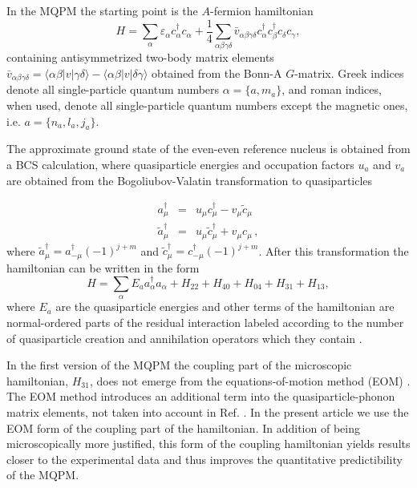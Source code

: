 In the MQPM the starting point is the $A$-fermion hamiltonian
\begin{equation}
       H = \sum_{\alpha} \varepsilon_{\alpha} c^{\dagger}_{\alpha} c_{\alpha} +
       \frac{1}{4}\sum_{\alpha\beta\gamma\delta} 
       {\bar{v}}_{\alpha\beta\gamma\delta}
       c^{\dagger}_{\alpha}c^{\dagger}_{\beta} c_{\delta} c_{\gamma},
\end{equation}
containing antisymmetrized two-body matrix elements 
${\bar{v}}_{\alpha\beta\gamma\delta}=\langle \alpha\beta\vert v
\vert \gamma\delta\rangle - \langle \alpha\beta\vert v 
\vert \delta\gamma\rangle$
obtained from the Bonn-A $G$-matrix. Greek 
indices denote all single-particle quantum numbers 
$\alpha=\lbrace a,m_a \rbrace$, and roman indices, when used, 
denote all single-particle quantum numbers except the magnetic ones, 
i.e. $a=\lbrace n_a,l_a,j_a \rbrace$. 

The approximate ground state of the even-even reference nucleus
is obtained from a BCS calculation, where
quasiparticle energies and occupation factors $u_a$ and $v_a$ are
obtained from the Bogoliubov-Valatin transformation to quasiparticles

\begin{eqnarray}
       a^{\dagger}_{\mu} &=& u_{\mu}c^{\dagger}_{\mu}-v_{\mu}\tilde{c}_{\mu} 
       \nonumber \\
       \tilde{a}^{\dagger}_{\mu} &=& u_{\mu}\tilde{c}^{\dagger}_{\mu}
       +v_{\mu}c_{\mu}\,, 
\end{eqnarray}
where $\tilde{a}^{\dagger}_{\mu}=a^{\dagger}_{-\mu}(-1)^{j+m}$ and 
$\tilde{c}^{\dagger}_{\mu}=c^{\dagger}_{-\mu}(-1)^{j+m}$.
After this transformation the hamiltonian can be written in the
form
\begin{equation}
       H = \sum_{\alpha} E_a a^{\dagger}_{\alpha} a_{\alpha} + H_{22} + H_{40}
           + H_{04} + H_{31} + H_{13},
\end{equation}
where $E_a$ are the quasiparticle energies and other terms
of the hamiltonian are normal-ordered parts of the residual
interaction labeled according to the number of quasiparticle
creation and annihilation operators which
they contain \cite{SUH88}.

In the first version of the MQPM \cite{TOI95} the coupling part of
the microscopic hamiltonian, $H_{31}$,  does not emerge from
the equations-of-motion method (EOM) \cite{ROW68}. The EOM method
introduces an additional term into the quasiparticle-phonon
matrix elements, not taken into account in Ref. \cite{TOI95}.
In the present article we use the EOM form of the coupling
part of the hamiltonian. In addition of being microscopically more
justified, this form of the coupling hamiltonian yields results
closer to the experimental data and thus improves the quantitative 
predictibility of the MQPM. 

